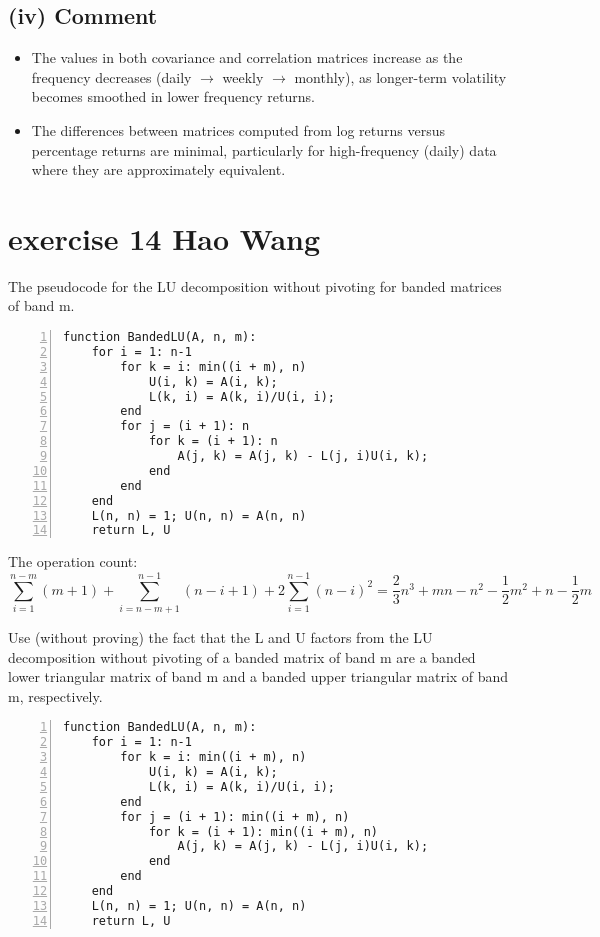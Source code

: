 \documentclass{article}
\begin{document}
\subsection*{(iv) Comment}
\begin{itemize}
    \item The values in both covariance and correlation matrices increase as the frequency decreases (daily $\rightarrow$ weekly $\rightarrow$ monthly), as longer-term volatility becomes smoothed in lower frequency returns.
    \item The differences between matrices computed from log returns versus percentage returns are minimal, particularly for high-frequency (daily) data where they are approximately equivalent.
\end{itemize}

\section{exercise 14 Hao Wang}
The pseudocode for the LU decomposition without pivoting for banded matrices of band m.

\begin{lstlisting}[basicstyle=\ttfamily, frame=single, numbers=left]
function BandedLU(A, n, m):
    for i = 1: n-1
        for k = i: min((i + m), n)
            U(i, k) = A(i, k);
            L(k, i) = A(k, i)/U(i, i);
        end
        for j = (i + 1): n
            for k = (i + 1): n
                A(j, k) = A(j, k) - L(j, i)U(i, k);
            end
        end
    end
    L(n, n) = 1; U(n, n) = A(n, n)
    return L, U
\end{lstlisting}

The operation count:
\[\sum_{i=1}^{n-m} (m+1) + \sum_{i=n-m+1}^{n-1} (n-i+1) + 2\sum_{i=1}^{n-1} (n-i)^2 = \frac{2}{3}n^3+mn-n^2-\frac{1}{2}m^2+n-\frac{1}{2}m\]

Use (without proving) the fact that the L and U factors from the LU decomposition without pivoting of a banded matrix of band m are a banded lower triangular matrix of band m and a banded upper triangular matrix of band m, respectively.

\begin{lstlisting}[basicstyle=\ttfamily, frame=single, numbers=left]
function BandedLU(A, n, m):
    for i = 1: n-1
        for k = i: min((i + m), n)
            U(i, k) = A(i, k);
            L(k, i) = A(k, i)/U(i, i);
        end
        for j = (i + 1): min((i + m), n)
            for k = (i + 1): min((i + m), n)
                A(j, k) = A(j, k) - L(j, i)U(i, k);
            end
        end
    end
    L(n, n) = 1; U(n, n) = A(n, n)
    return L, U
\end{lstlisting}
\end{document}
